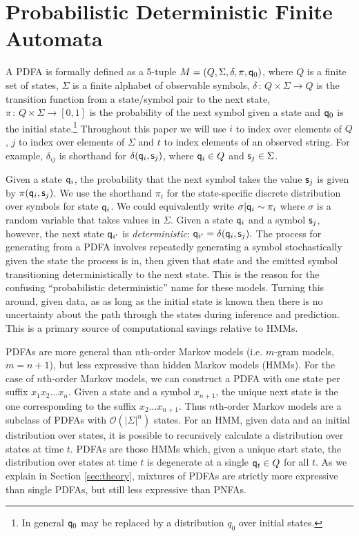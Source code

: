 \section{Probabilistic Deterministic Finite Automata}
\label{sec:PDFA}

A PDFA is formally defined as a 5-tuple $M = (Q,\Sigma,\delta,\pi,\state_0)$, where $Q$ is a finite set of states, $\Sigma$ is a finite alphabet of observable symbols, $\delta\,:\,Q\times\Sigma\rightarrow Q$ is the transition function from a state/symbol pair to the next state, $\pi\,:\,Q\times\Sigma\rightarrow[0,1]$ is the probability of the next symbol given a state and $\q_0$ is the initial state.\footnote{In general $\state_0$ may be replaced by a distribution $q_0$ over initial states.  }  Throughout this paper we will use $i$ to index over elements of $Q$, $j$ to index over elements of $\Sigma$ and $t$ to index elements of an observed string.  For example, $\delta_{ij}$ is shorthand for $\delta(\state_i,\symb_j)$, where $\state_i \in Q$ and $\symb_j \in \Sigma$.

Given a state $\state_i$, the probability that the next symbol takes the value $\symb_j$ is given by $\pi(\state_i,\symb_j)$.  We use the shorthand $\pi_i$ for the state-specific discrete distribution over symbols for state $\state_i$.  We could equivalently write $\sigma|\state_i \sim \pi_i$ where $\sigma$ is a random variable that takes values in $\Sigma$.  Given a state $\state_i$ and a symbol $\symb_j$, however, the next state $\state_{i'}$ is {\it deterministic}: $\state_{i'} = \delta(\state_i,\symb_j).$   The process for generating from a PDFA involves repeatedly generating a symbol stochastically given the state the process is in, then given that state and the emitted symbol transitioning deterministically to the next state.  This is the reason for the confusing ``probabilistic deterministic'' name for these models.  Turning this around, given data, as as long as the initial state is known then there is no uncertainty about the path through the states during inference and prediction. 
This is a primary source of computational savings relative to HMMs.

PDFAs are more general than $n$th-order Markov models (i.e. $m$-gram models, $m=n+1$), but less expressive than hidden Markov models (HMMs)\cite{Dupont2005}.  For the case of $n$th-order Markov models, we can construct a PDFA with one state per suffix $x_1 x_2 \ldots x_n$.  Given a state and a symbol $x_{n+1}$, the unique next state is the one corresponding to the suffix $x_2 \ldots x_{n+1}$.  Thus $n$th-order Markov models are a subclass of PDFAs with $\mathcal{O}(|\Sigma|^n)$ states.  For an HMM, given data and an initial distribution over states, it is possible to recursively calculate a distribution over states at time $t$.  PDFAs are those HMMs which, given a unique start state, the distribution over states at time $t$ is degenerate at a single $\q_t \in Q$ for all $t$.  As we explain in Section \ref{sec:theory}, mixtures of PDFAs are strictly more expressive than single PDFAs, but still less expressive than PNFAs.